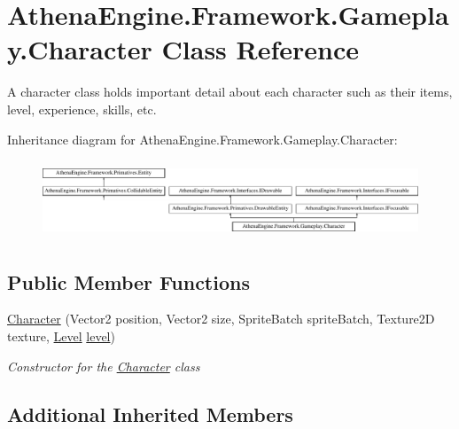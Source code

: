 \hypertarget{class_athena_engine_1_1_framework_1_1_gameplay_1_1_character}{\section{Athena\-Engine.\-Framework.\-Gameplay.\-Character Class Reference}
\label{class_athena_engine_1_1_framework_1_1_gameplay_1_1_character}
}


A character class holds important detail about each character such as their items, level, experience, skills, etc.  


Inheritance diagram for Athena\-Engine.\-Framework.\-Gameplay.\-Character\-:\begin{figure}[H]
\begin{center}
\leavevmode
\includegraphics[height=2.340648cm]{class_athena_engine_1_1_framework_1_1_gameplay_1_1_character}
\end{center}
\end{figure}
\subsection*{Public Member Functions}
\begin{DoxyCompactItemize}
\item 
\hyperlink{class_athena_engine_1_1_framework_1_1_gameplay_1_1_character_abd5fdf77de0dae2b45cbc790c7f68e4b}{Character} (Vector2 position, Vector2 size, Sprite\-Batch sprite\-Batch, Texture2\-D texture, \hyperlink{class_athena_engine_1_1_framework_1_1_gameplay_1_1_level}{Level} \hyperlink{class_athena_engine_1_1_framework_1_1_primatives_1_1_drawable_entity_a8c9db75b5a1d3222ebe2597f760ff8e1}{level})
\begin{DoxyCompactList}\small\item\em Constructor for the \hyperlink{class_athena_engine_1_1_framework_1_1_gameplay_1_1_character}{Character} class \end{DoxyCompactList}\end{DoxyCompactItemize}
\subsection*{Additional Inherited Members}


